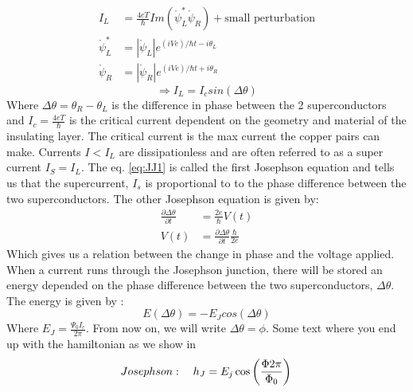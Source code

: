         \begin{equation}
            \begin{aligned}
                 I_L &= \frac{4 e T}{\hbar} Im(\mathring{\psi}^*_L \mathring{\psi}_R) + \text{small perturbation} \\
                    \mathring{\psi}^*_L &= |\mathring{\psi}_L| e^{(i V e)/\hbar t - i\theta_L}\\
                    \mathring{\psi}_R &= |\mathring{\psi}_R| e^{(i V e)/\hbar t + i\theta_R}
            \end{aligned}
        \end{equation}
        \begin{equation} \label{eq:JJ1}
            \Rightarrow I_L = I_c sin(\Delta \theta)
        \end{equation}
        Where $\Delta \theta = \theta_R- \theta_L$ is the difference in phase between the 2 superconductors and $I_c = \frac{4 e T }{\hbar}$ is the critical current dependent on the geometry and material of the insulating layer. The critical current is the max current the copper pairs can make. Currents $I< I_L$ are dissipationless and are often referred to as a super current $I_S = I_L $.  The eq. \ref{eq:JJ1} is called the first Josephson equation and tells us that the supercurrent, $I_s$ is proportional to to the phase difference between the two superconductors. The other Josephson equation is given by: 
        \begin{equation}
            \begin{aligned}
                \frac{\partial\Delta \theta}{\partial t } &= \frac{2e}{\hbar} V(t) \\
                V(t) &= \frac{\partial \Delta \theta}{\partial t} \frac{\hbar }{2 e}
            \end{aligned}
        \end{equation}
        Which gives us a relation between the change in phase and the voltage applied. When a current runs through the Josephson junction, there will be stored an energy depended on the phase difference between the two superconductors, $\Delta \theta$. The energy is given by \cite{Krantz2019}:
        \begin{equation}
            E(\Delta \theta) = -E_J cos(\Delta \theta) 
        \end{equation}
        Where $E_J =  \frac{\Psi_0 I_c}{2 \pi}$. From now on, we will write $\Delta\theta = \phi$. 
        Some text where you end up with the hamiltonian as we show in 
        \begin{equation}
            Josephson: \quad h_{J} = E_j \cos \left(\frac{\Phi 2 \pi}{\Phi_0} \right)    \\
        \end{equation}

